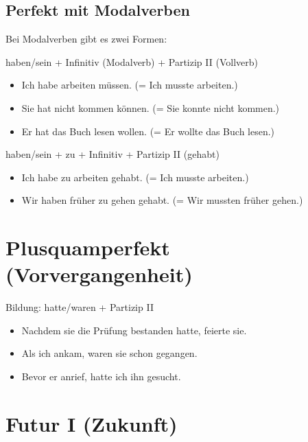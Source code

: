 \subsection{Perfekt mit Modalverben}
\label{sec:PerfektModal}

Bei Modalverben gibt es zwei Formen:

\begin{tcolorbox}[title=Standardform (Doppelter Infinitiv)]
\hfill\newline
haben/sein + Infinitiv (Modalverb) + Partizip II (Vollverb)
\end{tcolorbox}

\begin{itemize}
    \item Ich habe arbeiten müssen. (= Ich musste arbeiten.)
    \item Sie hat nicht kommen können. (= Sie konnte nicht kommen.)
    \item Er hat das Buch lesen wollen. (= Er wollte das Buch lesen.)
\end{itemize}

\begin{tcolorbox}[title=Ersatzform]
\hfill\newline
haben/sein + zu + Infinitiv + Partizip II (gehabt)
\end{tcolorbox}

\begin{itemize}
    \item Ich habe zu arbeiten gehabt. (= Ich musste arbeiten.)
    \item Wir haben früher zu gehen gehabt. (= Wir mussten früher gehen.)
\end{itemize}

\section{Plusquamperfekt (Vorvergangenheit)}
\label{sec:Plusquamperfekt}

Bildung: hatte/waren + Partizip II

\begin{itemize}
    \item Nachdem sie die Prüfung bestanden hatte, feierte sie.
    \item Als ich ankam, waren sie schon gegangen.
    \item Bevor er anrief, hatte ich ihn gesucht.
\end{itemize}

\section{Futur I (Zukunft)}
\label{sec:FuturI}

